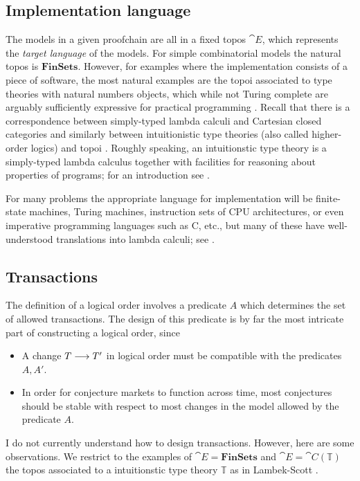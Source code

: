 \documentclass[english,letter paper,12pt,reqno]{article}
\theoremstyle{example}
\begin{document}
\subsection{Implementation language}\label{section:implementation_language}

The models in a given proofchain are all in a fixed topos $\cat{E}$, which represents the \emph{target language} of the models. For simple combinatorial models the natural topos is $\textbf{FinSets}$. However, for examples where the implementation consists of a piece of software, the most natural examples are the topoi associated to type theories with natural numbers objects, which while not Turing complete are arguably sufficiently expressive for practical programming \cite[\S III.3]{lambekscott}. Recall that there is a correspondence between simply-typed lambda calculi and Cartesian closed categories \cite[Part I]{lambekscott} and similarly between intuitionistic type theories (also called higher-order logics) and topoi \cite[Part II]{lambekscott}. Roughly speaking, an intuitionstic type theory is a simply-typed lambda calculus together with facilities for reasoning about properties of programs; for an introduction see \cite[Lecture 9]{risingseminar}.

For many problems the appropriate language for implementation will be finite-state machines, Turing machines, instruction sets of CPU architectures, or even imperative programming languages such as C, etc., but many of these have well-understood translations into lambda calculi; see \cite{zadarnowski}.

\subsection{Transactions}\label{section:transactions}

The definition of a logical order involves a predicate $A$ which determines the set of allowed transactions. The design of this predicate is by far the most intricate part of constructing a logical order, since
\begin{itemize}
\item A change $T \longrightarrow T'$ in logical order must be compatible with the predicates $A,A'$.
\item In order for conjecture markets to function across time, most conjectures should be stable with respect to most changes in the model allowed by the predicate $A$.
\end{itemize}
I do not currently understand how to design transactions. However, here are some observations. We restrict to the examples of $\cat{E} = \textbf{FinSets}$ and $\cat{E} = \cat{C}(\mathbb{T})$ the topos associated to a intuitionstic type theory $\mathbb{T}$ as in Lambek-Scott \cite[\S II.12]{lambekscott}.
\end{document}
